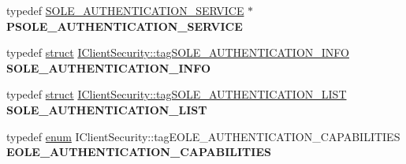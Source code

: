 \begin{DoxyCompactItemize}
typedef \hyperlink{struct_i_client_security_1_1tag_s_o_l_e___a_u_t_h_e_n_t_i_c_a_t_i_o_n___s_e_r_v_i_c_e}{S\+O\+L\+E\+\_\+\+A\+U\+T\+H\+E\+N\+T\+I\+C\+A\+T\+I\+O\+N\+\_\+\+S\+E\+R\+V\+I\+CE} $\ast$ {\bfseries P\+S\+O\+L\+E\+\_\+\+A\+U\+T\+H\+E\+N\+T\+I\+C\+A\+T\+I\+O\+N\+\_\+\+S\+E\+R\+V\+I\+CE}
\item 
\mbox{\label{interface_i_client_security_a3c8923694a14251eeb38aca0706a6433}} 
typedef \hyperlink{interfacestruct}{struct} \hyperlink{struct_i_client_security_1_1tag_s_o_l_e___a_u_t_h_e_n_t_i_c_a_t_i_o_n___i_n_f_o}{I\+Client\+Security\+::tag\+S\+O\+L\+E\+\_\+\+A\+U\+T\+H\+E\+N\+T\+I\+C\+A\+T\+I\+O\+N\+\_\+\+I\+N\+FO} {\bfseries S\+O\+L\+E\+\_\+\+A\+U\+T\+H\+E\+N\+T\+I\+C\+A\+T\+I\+O\+N\+\_\+\+I\+N\+FO}
\item 
\mbox{\label{interface_i_client_security_a0a4bcf4188525c41a5e5b697dc458401}} 
typedef \hyperlink{interfacestruct}{struct} \hyperlink{struct_i_client_security_1_1tag_s_o_l_e___a_u_t_h_e_n_t_i_c_a_t_i_o_n___l_i_s_t}{I\+Client\+Security\+::tag\+S\+O\+L\+E\+\_\+\+A\+U\+T\+H\+E\+N\+T\+I\+C\+A\+T\+I\+O\+N\+\_\+\+L\+I\+ST} {\bfseries S\+O\+L\+E\+\_\+\+A\+U\+T\+H\+E\+N\+T\+I\+C\+A\+T\+I\+O\+N\+\_\+\+L\+I\+ST}
\item 
\mbox{\label{interface_i_client_security_a6a580fa7001b29e372a8a59a49aea892}} 
typedef \hyperlink{interfaceenum}{enum} I\+Client\+Security\+::tag\+E\+O\+L\+E\+\_\+\+A\+U\+T\+H\+E\+N\+T\+I\+C\+A\+T\+I\+O\+N\+\_\+\+C\+A\+P\+A\+B\+I\+L\+I\+T\+I\+ES {\bfseries E\+O\+L\+E\+\_\+\+A\+U\+T\+H\+E\+N\+T\+I\+C\+A\+T\+I\+O\+N\+\_\+\+C\+A\+P\+A\+B\+I\+L\+I\+T\+I\+ES}
\end{DoxyCompactItemize}
